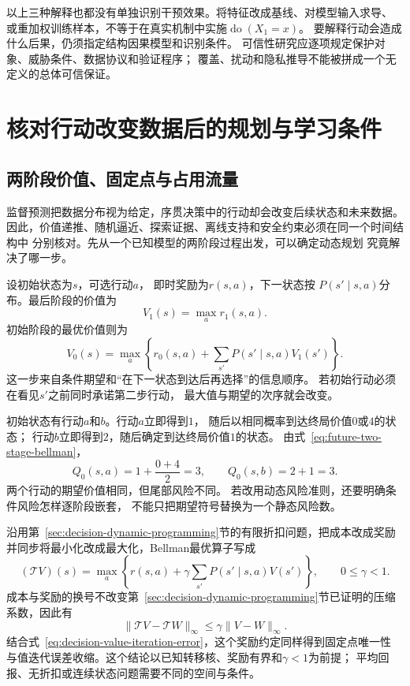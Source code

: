 以上三种解释也都没有单独识别干预效果。将特征改成基线、对模型输入求导、
或重加权训练样本，不等于在真实机制中实施$\operatorname{do}(X_1=x)$。
要解释行动会造成什么后果，仍须指定结构因果模型和识别条件。
可信性研究应逐项规定保护对象、威胁条件、数据协议和验证程序；
覆盖、扰动和隐私推导不能被拼成一个无定义的总体可信保证。

\section{核对行动改变数据后的规划与学习条件}
\label{sec:future-reinforcement-learning-sequential-decision}

\subsection{两阶段价值、固定点与占用流量}
\label{sec:future-two-step-fixed-point-occupancy}

监督预测把数据分布视为给定，序贯决策中的行动却会改变后续状态和未来数据。
因此，价值递推、随机逼近、探索证据、离线支持和安全约束必须在同一个时间结构中
分别核对。先从一个已知模型的两阶段过程出发，可以确定动态规划
究竟解决了哪一步。

设初始状态为$s$，可选行动$a$，
即时奖励为$r(s,a)$，下一状态按
$P(s'\mid s,a)$分布。最后阶段的价值为
\[
  V_1(s)
  =
  \max_a r_1(s,a).
\]
初始阶段的最优价值则为
\begin{equation}
  V_0(s)
  =
  \max_a
  \left\{
    r_0(s,a)
    +
    \sum_{s'}P(s'\mid s,a)V_1(s')
  \right\}.
  \label{eq:future-two-stage-bellman}
\end{equation}
这一步来自条件期望和“在下一状态到达后再选择”的信息顺序。
若初始行动必须在看见$s'$之前同时承诺第二步行动，
最大值与期望的次序就会改变。

\begin{example}[即时奖励与未来价值]
  \label{ex:future-two-stage-decision}
  初始状态有行动$a$和$b$。行动$a$立即得到$1$，
  随后以相同概率到达终局价值$0$或$4$的状态；
  行动$b$立即得到$2$，随后确定到达终局价值$1$的状态。
  由式~\eqref{eq:future-two-stage-bellman}，
  \[
    Q_0(s,a)=1+\frac{0+4}{2}=3,
    \qquad
    Q_0(s,b)=2+1=3.
  \]
  两个行动的期望价值相同，但尾部风险不同。
  若改用动态风险准则，还要明确条件风险怎样逐阶段嵌套，
  不能只把期望符号替换为一个静态风险数。
\end{example}

沿用第~\ref{sec:decision-dynamic-programming}节的有限折扣问题，把成本改成奖励并同步将最小化改成最大化，Bellman最优算子写成
\[
  (\mathcal{T}V)(s)
  =
  \max_a
  \left\{
    r(s,a)
    +
    \gamma
    \sum_{s'}P(s'\mid s,a)V(s')
  \right\},
  \qquad 0\leq\gamma<1.
\]
成本与奖励的换号不改变第~\ref{sec:decision-dynamic-programming}节已证明的压缩系数，因此有
\[
  \lVert\mathcal{T}V-\mathcal{T}W\rVert_\infty
  \leq
  \gamma\lVert V-W\rVert_\infty.
\]
结合式~\eqref{eq:decision-value-iteration-error}，这个奖励约定同样得到固定点唯一性
与值迭代误差收缩。这个结论以已知转移核、奖励有界和$\gamma<1$为前提；
平均回报、无折扣或连续状态问题需要不同的空间与条件。

